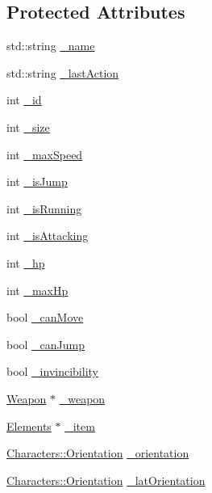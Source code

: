 \subsection*{Protected Attributes}
\begin{DoxyCompactItemize}
\item 
std\-::string \hyperlink{class_characters_aa07da1842926f30143e7504fb6cbeb18}{\-\_\-name}
\item 
std\-::string \hyperlink{class_characters_a7fd13ae98277d01b16ad744852d5bd9a}{\-\_\-last\-Action}
\item 
int \hyperlink{class_characters_a1ea81e7d8e2bfb27f9a55b9aa6fbdd2a}{\-\_\-id}
\item 
int \hyperlink{class_characters_aceee7dd6aae36a7eacefcc276f3423c0}{\-\_\-size}
\item 
int \hyperlink{class_characters_a71736ea7efb50f0174865607d715c8f1}{\-\_\-max\-Speed}
\item 
int \hyperlink{class_characters_a05cdafb4f63caae675982af22c32fba5}{\-\_\-is\-Jump}
\item 
int \hyperlink{class_characters_a9a8242e24955e5a0c75e69598687c55f}{\-\_\-is\-Running}
\item 
int \hyperlink{class_characters_a19ecafdcd8a707d8b3e0fe3c7069b99e}{\-\_\-is\-Attacking}
\item 
int \hyperlink{class_characters_a08ee77521ac4ceaf02fc663e41251e6d}{\-\_\-hp}
\item 
int \hyperlink{class_characters_abc14e96e35df47aba94dbf23b3dbdba6}{\-\_\-max\-Hp}
\item 
bool \hyperlink{class_characters_a817a390b358c806dd3e5c353a815871c}{\-\_\-can\-Move}
\item 
bool \hyperlink{class_characters_a7488ab360a4a770d46a2578f87f02511}{\-\_\-can\-Jump}
\item 
bool \hyperlink{class_characters_a6a43d519e518708eddef2438dae04a1f}{\-\_\-invincibility}
\item 
\hyperlink{class_weapon}{Weapon} $\ast$ \hyperlink{class_characters_aee5f545db9a5e0ee19af66dc0754b602}{\-\_\-weapon}
\item 
\hyperlink{class_elements}{Elements} $\ast$ \hyperlink{class_characters_a0befc3d5cf681d5cd555929ffde0d25a}{\-\_\-item}
\item 
\hyperlink{class_characters_a95d5115bd36cdc1a7a21ab8c679f7524}{Characters\-::\-Orientation} \hyperlink{class_characters_ad1f8866efe25f7c8997a134f536fe121}{\-\_\-orientation}
\item 
\hyperlink{class_characters_a95d5115bd36cdc1a7a21ab8c679f7524}{Characters\-::\-Orientation} \hyperlink{class_characters_a1d78d9a93ebfad3f058a155505257c91}{\-\_\-lat\-Orientation}

\end{DoxyCompactItemize}
